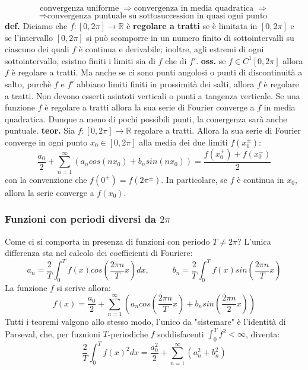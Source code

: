 \newline
\[
\text{convergenza uniforme}\; \Rightarrow \text{convergenza in media quadratica}\; \Rightarrow 
\]
\[
    \Rightarrow  \text{convergenza puntuale su sottosuccession in quasi ogni punto}\;
\]
\newline
\textbf{def.} Diciamo che $f : [0,2\pi] \rightarrow \mathbb{R}$ è \textbf{regolare a tratti} se è limitata in $[0,2\pi]$ e se l'intervallo $[0,2\pi]$ si può scomporre in un numero finito di sottointervalli su ciascuno dei quali $f$ è continua e derivabile; inoltre, agli estremi di ogni sottointervallo, esistno finiti i limiti sia di $f$ che di $f'$.\newline
\newline
\textbf{oss.} se $f \in C^1[0,2\pi]$ allora $f$ è regolare a tratti. Ma anche se ci sono punti angolosi o punti di discontinuità a salto, purchè $f$ e $f'$ abbiano limiti finiti in prossimità dei salti, allora $f$ è regolare a tratti. Non devono esserti asintoti verticali o punti a tangenza verticale.\newline
\newline
Se una funzione $f$ è regolare a tratti allora la sua serie di Fourier converge a $f$ in media quadratica. Dunque a meno di pochi possibili punti, la conergenza sarà anche puntuale.\newline
\newline
\textbf{teor.} Sia $f: [0,2\pi] \rightarrow \mathbb{R}$ regolare a tratti. Allora la sua serie di Fourier converge in ogni punto $x_0 \in [0,2\pi]$ alla media dei due limiti $f(x_0^{\pm})$:
\[
    \frac{a_0}{2} + \sum_{n=1}^{\infty} \left( a_n cos(nx_0) + b_n sin(nx_0) \right) = \frac{f(x_0^+) + f(x_0^-)}{2}
\]
con la convenzione che $f(0^\pm) = f(2\pi^\pm)$. In particolare, se $f$ è continua in $x_0$, allora la serie converge a $f(x_0)$.
\subsubsection{Funzioni con periodi diversi da $2\pi$}
Come ci si comporta in presenza di funzioni con periodo $T \neq 2\pi$?\newline
L'unica differenza sta nel calcolo dei coefficienti di Fouriere:
\[
    a_n = \frac{2}{T}\int_{0}^{T}f(x) cos\left( \frac{2\pi n}{T}x \right) dx, \;\;\;\;\; \;\;\;\;\; b_n = \frac{2}{T} \int_{0}^{T}f(x) sin\left( \frac{2\pi n}{T}x \right)
\]
La funzione $f$ si scrive allora:
\[
    f(x) = \frac{a_0}{2} + \sum_{n=1}^{\infty} \left( a_n cos\left( \frac{2\pi n}{T}x \right) + b_n sin \left( \frac{2\pi n}{2}x \right) \right)
\]
Tutti i teoremi valgono allo stesso modo, l'unico da "sistemare" è l'identità di Parseval, che, per fuznioni $T$-periodiche $f$ soddisfacenti $\int_{0}^{T} f^2 < \infty$, diventa:
\[
    \frac{2}{T} \int_{0}^{T}f(x)^2 dx = \frac{a_0^2}{2} + \sum_{n=1}^{\infty} (a_n^2 + b_n^2)
\]
